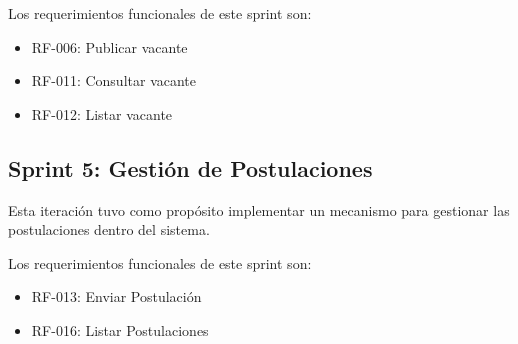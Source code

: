 Los requerimientos funcionales de este sprint son:

\begin{itemize}
    \item RF-006: Publicar vacante
    \item RF-011: Consultar vacante
    \item RF-012: Listar vacante
\end{itemize}


\subsection{Sprint 5: Gestión de Postulaciones}

Esta iteración tuvo como propósito implementar un mecanismo para gestionar las postulaciones dentro del sistema.


Los requerimientos funcionales de este sprint son:

\begin{itemize}
    \item RF-013: Enviar Postulación
    \item RF-016: Listar Postulaciones
\end{itemize}

